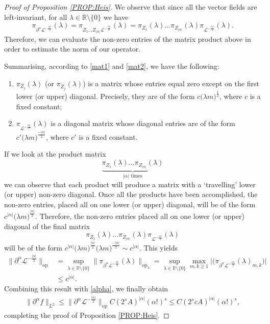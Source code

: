 \documentclass[12pt,oneside,a4paper]{book}
\numberwithin{equation}{section}     %
\theoremstyle{plain}
\theoremstyle{definition}
\DeclareMathOperator{\OP}{op}
\newcommand{\R}{{\mathbb R}}
\newcommand{\slp}{{\mathcal L}}
\begin{document}
\begin{proof}[Proof of Proposition \ref{PROP:Heis}]
	We observe that since all the vector fields are left-invariant, for all $\lambda\in\R\setminus \{0\}$ we have
	\[
	\pi_{\partial^\alpha\slp^{-\frac{|\alpha|}{2}}}(\lambda)=\pi_{Z_1\dots Z_{|\alpha|}\slp^{-\frac{|\alpha|}{2}}}(\lambda)=\pi_{Z_1}(\lambda)\dots\pi_{Z_{|\alpha|}}(\lambda)\pi_{\slp^{-\frac{|\alpha|}{2}}}(\lambda).
	\]
	Therefore, we can evaluate the non-zero entries of the matrix product above in order to estimate the norm of our operator.
	
	Summarising, according to \eqref{mat1} and \eqref{mat2}, we have the following:
	\begin{enumerate}[1.]
		\item $\pi_{Z_j}(\lambda)$ (or $\pi_{\overline Z_j}(\lambda)$) is a matrix whose entries equal zero except on the first lower (or upper) diagonal. Precisely, they are of the form $c{\big(\lambda m\big)^\frac{1}{2}}$, where $c$ is a fixed constant;
		\item $\pi_{\slp^{-\frac{|\alpha|}{2}}}(\lambda)$ is a diagonal matrix whose diagonal entries are of the form ${c' \big(\lambda m\big)^\frac{-|\alpha|}{2}}$, where $c'$ is a fixed constant.
	\end{enumerate}
	If we look at the product matrix
	\[
	\underbrace{\pi_{Z_1}(\lambda)\dots\pi_{Z_{|\alpha|}}(\lambda)}_{|\alpha|\text{ times}}
	\]
	we can observe that each product will produce a matrix with a `travelling' lower (or upper) non-zero diagonal. Once all the products have been accomplished, the non-zero entries, placed all on one lower (or upper) diagonal,  will be of the form $ c^{|\alpha|}\big(\lambda m\big)^{\frac{|\alpha|}{2}}$. Therefore, the non-zero entries placed all on one lower (or upper) diagonal of the final matrix
	\[
	\pi_{Z_1}(\lambda)\dots\pi_{Z_{|\alpha|}}(\lambda)\pi_{\slp^{-\frac{|\alpha|}{2}}}(\lambda)
	\]
	will be of the form $c^{|\alpha|}\big(\lambda m\big)^\frac{|\alpha|}{2}\big(\lambda m\big)^\frac{-|\alpha|}{2}\sim c^{|\alpha|}$. This yields
	\begin{align*}
	\|\partial^\alpha\slp^{-\frac{|\alpha|}{2}}\|_{\OP}&=\sup_{\lambda\in\R\setminus \{0\}}\|\pi_{\partial^\alpha\slp^{-\frac{|\alpha|}{2}}}(\lambda)\|_{\OP_{\lambda}}=\sup_{\lambda\in\R\setminus \{0\}}\max_{m,k\geq 1}\Big|\big(\pi_{\partial^\alpha\slp^{-\frac{|\alpha|}{2}}}(\lambda)_{m,k}\big)\Big|\\
	&\leq c^{|\alpha|}.
	\end{align*} 
	Combining this result with \eqref{alpha}, we finally obtain
	\begin{align*}
	\|\partial^\alpha f\|_{L^2}\leq \|\partial^\alpha\slp^{-\frac{|\alpha|}{2}}\|_{\OP}C(2^sA)^{|\alpha|}(\alpha!)^s\leq C(2^scA)^{|\alpha|}(\alpha!)^s,
	\end{align*}
	completing the proof of Proposition \ref{PROP:Heis}.
\end{proof}
\end{document}
